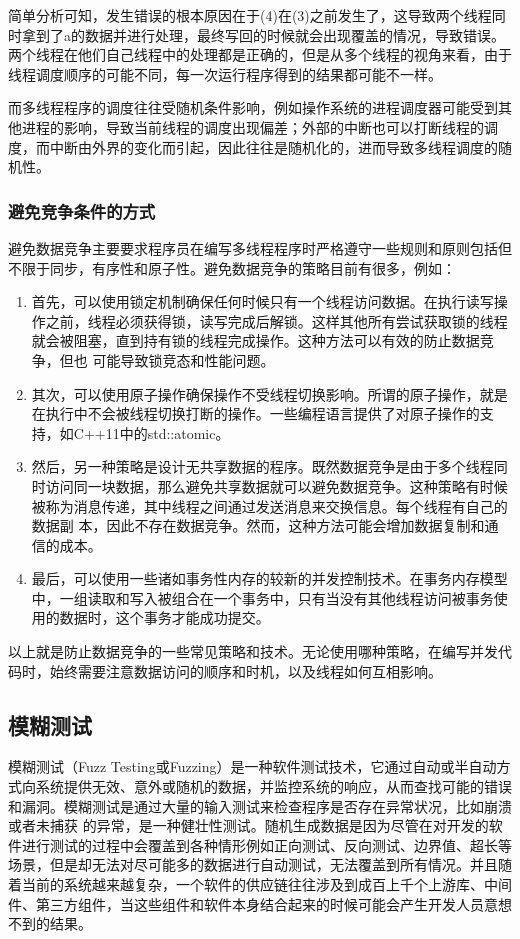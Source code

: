 简单分析可知，发生错误的根本原因在于(4)在(3)之前发生了，这导致两个线程同时拿到了a的数据并进行处理，最终写回的时候就会出现覆盖的情况，导致错误。两个线程在他们自己线程中的处理都是正确的，但是从多个线程的视角来看，由于线程调度顺序的可能不同，每一次运行程序得到的结果都可能不一样。

而多线程程序的调度往往受随机条件影响，例如操作系统的进程调度器可能受到其他进程的影响，导致当前线程的调度出现偏差；外部的中断也可以打断线程的调度，而中断由外界的变化而引起，因此往往是随机化的，进而导致多线程调度的随机性。

\subsubsection{避免竞争条件的方式}

避免数据竞争主要要求程序员在编写多线程程序时严格遵守一些规则和原则包括但不限于同步，有序性和原子性。避免数据竞争的策略目前有很多，例如：

\begin{enumerate}
\item 首先，可以使用锁定机制确保任何时候只有一个线程访问数据。在执行读写操作之前，线程必须获得锁，读写完成后解锁。这样其他所有尝试获取锁的线程就会被阻塞，直到持有锁的线程完成操作。这种方法可以有效的防止数据竞争，但也 可能导致锁竞态和性能问题。
\item 其次，可以使用原子操作确保操作不受线程切换影响。所谓的原子操作，就是在执行中不会被线程切换打断的操作。一些编程语言提供了对原子操作的支持，如C++11中的std::atomic。
\item 然后，另一种策略是设计无共享数据的程序。既然数据竞争是由于多个线程同时访问同一块数据，那么避免共享数据就可以避免数据竞争。这种策略有时候被称为消息传递，其中线程之间通过发送消息来交换信息。每个线程有自己的数据副 本，因此不存在数据竞争。然而，这种方法可能会增加数据复制和通信的成本。
\item 最后，可以使用一些诸如事务性内存的较新的并发控制技术。在事务内存模型中，一组读取和写入被组合在一个事务中，只有当没有其他线程访问被事务使用的数据时，这个事务才能成功提交。
\end{enumerate}

以上就是防止数据竞争的一些常见策略和技术。无论使用哪种策略，在编写并发代码时，始终需要注意数据访问的顺序和时机，以及线程如何互相影响。

\subsection{模糊测试}

模糊测试\cite{sutton2007fuzzing, manes2018fuzzing}（Fuzz Testing或Fuzzing）是一种软件测试技术，它通过自动或半自动方式向系统提供无效、意外或随机的数据，并监控系统的响应，从而查找可能的错误和漏洞。模糊测试是通过大量的输入测试来检查程序是否存在异常状况，比如崩溃或者未捕获 的异常，是一种健壮性测试。随机生成数据是因为尽管在对开发的软件进行测试的过程中会覆盖到各种情形例如正向测试、反向测试、边界值、超长等场景，但是却无法对尽可能多的数据进行自动测试，无法覆盖到所有情况。并且随着当前的系统越来越复杂，一个软件的供应链往往涉及到成百上千个上游库、中间件、第三方组件，当这些组件和软件本身结合起来的时候可能会产生开发人员意想不到的结果。

